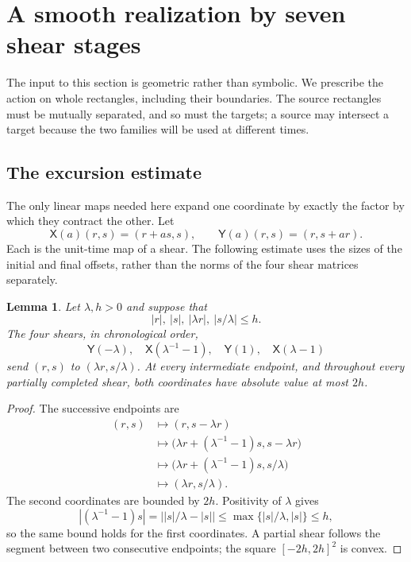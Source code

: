 \documentclass[11pt]{article}
\newtheorem{lemma}[theorem]{Lemma}
\theoremstyle{remark}
\begin{document}
\section{A smooth realization by seven shear stages}\label{sec:shears}
The input to this section is geometric rather than symbolic. We prescribe
the action on whole rectangles, including their boundaries. The source
rectangles must be mutually separated, and so must the targets; a source
may intersect a target because the two families will be used at different
times.

\subsection{The excursion estimate}
The only linear maps needed here expand one coordinate by exactly the
factor by which they contract the other. Let
\[
 \mathsf X(a)(r,s)=(r+as,s),\qquad
 \mathsf Y(a)(r,s)=(r,s+ar).
\]
Each is the unit-time map of a shear. The following estimate uses the sizes
of the initial and final offsets, rather than the norms of the four shear
matrices separately.

\begin{lemma}\label{lem:excursion}
Let $\lambda,h>0$ and suppose that
\[
 |r|,\ |s|,\ |\lambda r|,\ |s/\lambda|\le h.
\]
The four shears, in chronological order,
\begin{equation}\label{eq:shears}
 \mathsf Y(-\lambda),\quad \mathsf X(\lambda^{-1}-1),\quad
 \mathsf Y(1),\quad \mathsf X(\lambda-1)
\end{equation}
send $(r,s)$ to $(\lambda r,s/\lambda)$. At every intermediate endpoint,
and throughout every partially completed shear, both coordinates have
absolute value at most $2h$.
\end{lemma}
\begin{proof}
The successive endpoints are
\begin{align*}
 (r,s)&\longmapsto(r,s-\lambda r)\\
 &\longmapsto\bigl(\lambda r+(\lambda^{-1}-1)s,s-\lambda r\bigr)\\
 &\longmapsto\bigl(\lambda r+(\lambda^{-1}-1)s,s/\lambda\bigr)\\
 &\longmapsto(\lambda r,s/\lambda).
\end{align*}
The second coordinates are bounded by $2h$. Positivity of $\lambda$ gives
\[
 |(\lambda^{-1}-1)s|
 =\bigl||s|/\lambda-|s|\bigr|
 \le\max\{|s|/\lambda,|s|\}\le h,
\]
so the same bound holds for the first coordinates. A partial shear follows
the segment between two consecutive endpoints; the square $[-2h,2h]^2$
is convex.
\end{proof}
\end{document}
